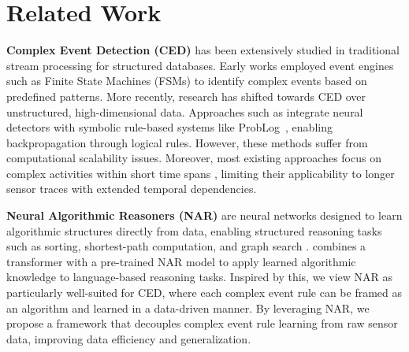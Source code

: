 \section{Related Work}
\textbf{Complex Event Detection (CED)} has been extensively studied in traditional stream processing for structured databases. Early works \cite{CEPoverview_2012,Schultz_2009,Debar_2001} employed event engines such as Finite State Machines (FSMs) to identify complex events based on predefined patterns. More recently, research has shifted towards CED over unstructured, high-dimensional data. Approaches such as \cite{xing2020neuroplex,ROIGVILAMALA2023119376,deepproblog2} integrate neural detectors with symbolic rule-based systems like ProbLog~\cite{problog,deepproblog,deepproblog2}, enabling backpropagation through logical rules. However, these methods suffer from computational scalability issues. Moreover, most existing approaches focus on complex activities within short time spans \cite{khan2023hybridgraphnetworkcomplex,activitynet,THUMOS14}, limiting their applicability to longer sensor traces with extended temporal dependencies.

\textbf{Neural Algorithmic Reasoners (NAR)} are neural networks designed to learn algorithmic structures directly from data, enabling structured reasoning tasks such as sorting, shortest-path computation, and graph search \cite{narbenchmark,generalnar,naroverview}. \cite{transformernar} combines a transformer with a pre-trained NAR model to apply learned algorithmic knowledge to language-based reasoning tasks. Inspired by this, we view NAR as particularly well-suited for CED, where each complex event rule can be framed as an algorithm and learned in a data-driven manner. By leveraging NAR, we propose a framework that decouples complex event rule learning from raw sensor data, improving data efficiency and generalization.
